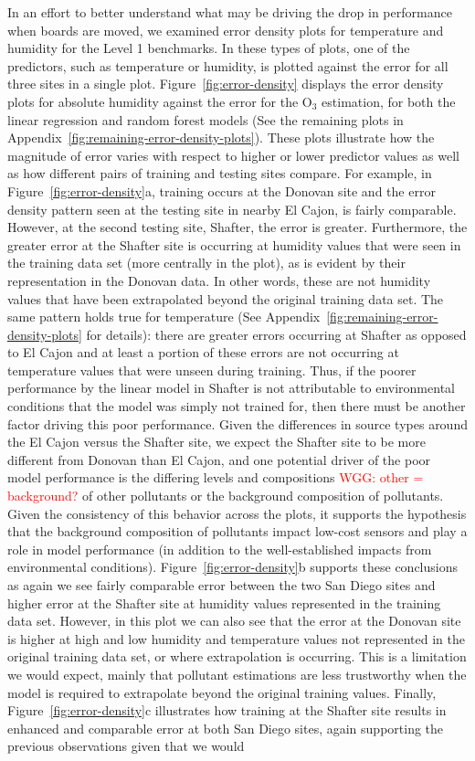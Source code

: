 \documentclass[journal abbreviation, manuscript]{copernicus}
\newcommand\todo[1]{\textcolor{red}{#1}}
\newcommand{\textus}[1]{$_{\text{#1}}$}
\begin{document}
In an effort to better understand what may be driving the drop in performance when boards are moved, we examined error density plots for temperature and humidity for the Level 1 benchmarks. In these types of plots, one of the predictors, such as temperature or humidity, is plotted against the error for all three sites in a single plot.  Figure~\ref{fig:error-density} displays the error density plots for absolute humidity against the error for the O\textus{3} estimation, for both the linear regression and random forest models (See the remaining plots in Appendix~\ref{fig:remaining-error-density-plots}). These plots illustrate how the magnitude of error varies with respect to higher or lower predictor values as well as how different pairs of training and testing sites compare. For example, in Figure~\ref{fig:error-density}a, training occurs at the Donovan site and the error density pattern seen at the testing site in nearby El Cajon, is fairly comparable.  However, at the second testing site, Shafter, the error is greater. Furthermore, the greater error at the Shafter site is occurring at humidity values that were seen in the training data set (more centrally in the plot), as is evident by their representation in the Donovan data. In other words, these are not humidity values that have been extrapolated beyond the original training data set. The same pattern holds true for temperature (See Appendix~\ref{fig:remaining-error-density-plots} for details): there are greater errors occurring at Shafter as opposed to El Cajon and at least a portion of these errors are not occurring at temperature values that were unseen during training. Thus, if the poorer performance by the linear model in Shafter is not attributable to environmental conditions that the model was simply not trained for, then there must be another factor driving this poor performance. Given the differences in source types around the El Cajon versus the Shafter site, we expect the Shafter site to be more different from Donovan than El Cajon, and one potential driver of the poor model performance is the differing levels and compositions \todo{WGG: other = background?} of other pollutants or the background composition of pollutants.  Given the consistency of this behavior across the plots, it supports the hypothesis that the background composition of pollutants impact low-cost sensors and play a role in model performance (in addition to the well-established impacts from environmental conditions).  Figure~\ref{fig:error-density}b supports these conclusions as again we see fairly comparable error between the two San Diego sites and higher error at the Shafter site at humidity values represented in the training data set.  However, in this plot we can also see that the error at the Donovan site is higher at high and low humidity and temperature values not represented in the original training data set, or where extrapolation is occurring.  This is a limitation we would expect, mainly that pollutant estimations are less trustworthy when the model is required to extrapolate beyond the original training values. Finally, Figure~\ref{fig:error-density}c illustrates how training at the Shafter site results in enhanced and comparable error at both San Diego sites, again supporting the previous observations given that we would 
\end{document}
